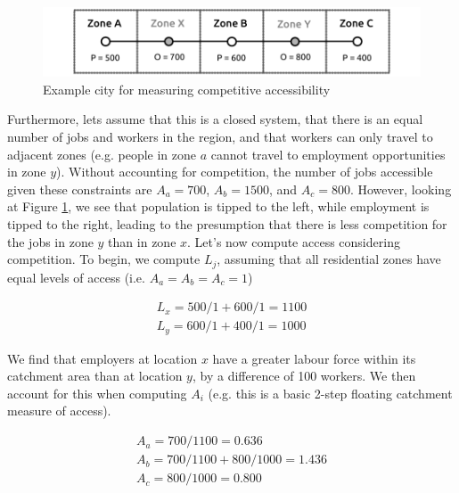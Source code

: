 \documentclass[11 pt, letterpaper]{article}
\begin{document}
{\begin{figure}[H]
	\caption{Example city for measuring competitive accessibility} 
	\label{S1}
	\centerline{\includegraphics[width=5in]{figures/linear_city/linear_city_S1.pdf}}
	\vspace{2mm}
\end{figure}

Furthermore, lets assume that this is a closed system, that there is an equal number of jobs and workers in the region, and that workers can only travel to adjacent zones (e.g. people in zone $a$ cannot travel to employment opportunities in zone $y$). Without accounting for competition, the number of jobs accessible given these constraints are $A_{a} = 700$, $A_{b} = 1500$, and $A_{c} = 800$. However, looking at Figure \ref{S1}, we see that population is tipped to the left, while employment is tipped to the right, leading to the presumption that there is less competition for the jobs in zone $y$ than in zone $x$. Let's now compute access considering competition. To begin, we compute $L_j$, assuming that all residential zones have equal levels of access (i.e. $A_a = A_b = A_c = 1$)

\begin{equation}
\begin{array}{l}
L_{x} = 500 / 1 + 600 / 1 = 1100 \\
L_{y} = 600 / 1 + 400 / 1 = 1000
\end{array}
\end{equation}

We find that employers at location $x$ have a greater labour force within its catchment area than at location $y$, by a difference of 100 workers. We then account for this when computing $A_i$ (e.g. this is a basic 2-step floating catchment measure of access). 

\begin{equation}
\begin{array}{l}
A_{a} = {700}/{1100} = 0.636 \\
A_{b} = {700}/{1100} + {800}/{1000} = 1.436\\
A_{c} = {800}/{1000} = 0.800
\end{array}
\end{equation}

}
\end{document}
